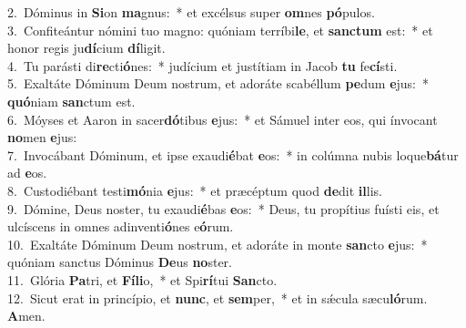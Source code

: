 {2.~}Dóminus in \textbf{Si}on \textbf{ma}gnus:~* et excélsus super \textbf{om}nes \textbf{pó}pulos.\\
{3.~}Confiteántur nómini tuo magno: quóniam terríbi\textbf{le}, et \textbf{san}\textbf{ctum} est:~* et honor regis ju\textbf{dí}cium \textbf{dí}ligit.\\
{4.~}Tu parásti di\textbf{re}cti\textbf{ó}nes:~* judícium et justítiam in Jacob \textbf{tu} fe\textbf{cí}sti.\\
{5.~}Exaltáte Dóminum Deum nostrum, et adoráte scabéllum \textbf{pe}dum \textbf{e}jus:~* \textbf{quó}niam \textbf{san}ctum est.\\
{6.~}Móyses et Aaron in sacer\textbf{dó}tibus \textbf{e}jus:~* et Sámuel inter eos, qui ínvocant \textbf{no}men \textbf{e}jus:\\
{7.~}Invocábant Dóminum, et ipse exaudi\textbf{é}bat \textbf{e}os:~* in colúmna nubis loque\textbf{bá}tur ad \textbf{e}os.\\
{8.~}Custodiébant testi\textbf{mó}nia \textbf{e}jus:~* et præcéptum quod \textbf{de}dit \textbf{il}lis.\\
{9.~}Dómine, Deus noster, tu exaudi\textbf{é}bas \textbf{e}os:~* Deus, tu propítius fuísti eis, et ulcíscens in omnes adinventi\textbf{ó}nes e\textbf{ó}rum.\\
{10.~}Exaltáte Dóminum Deum nostrum, et adoráte in monte \textbf{san}cto \textbf{e}jus:~* quóniam sanctus Dóminus \textbf{De}us \textbf{no}ster.\\
{11.~}Glória \textbf{Pa}tri, et \textbf{Fí}\textbf{li}o,~* et Spi\textbf{rí}tui \textbf{San}cto.\\
{12.~}Sicut erat in princípio, et \textbf{nunc}, et \textbf{sem}per,~* et in sǽcula sæcu\textbf{ló}rum. \textbf{A}men.\\
